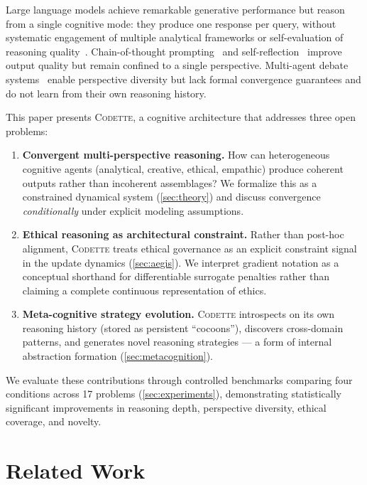 \documentclass[11pt,a4paper]{article}
\newcommand{\codette}{\textsc{Codette}}
\begin{document}
Large language models achieve remarkable generative performance but reason from a single cognitive mode: they produce one response per query, without systematic engagement of multiple analytical frameworks or self-evaluation of reasoning quality~\citep{bender2021dangers,bommasani2021opportunities}. Chain-of-thought prompting~\citep{wei2022chain} and self-reflection~\citep{shinn2023reflexion} improve output quality but remain confined to a single perspective. Multi-agent debate systems~\citep{wu2023autogen} enable perspective diversity but lack formal convergence guarantees and do not learn from their own reasoning history.

This paper presents \codette{}, a cognitive architecture that addresses three open problems:

\begin{enumerate}[leftmargin=*]
  \item \textbf{Convergent multi-perspective reasoning.} How can heterogeneous cognitive agents (analytical, creative, ethical, empathic) produce coherent outputs rather than incoherent assemblages? We formalize this as a constrained dynamical system (\cref{sec:theory}) and discuss convergence \emph{conditionally} under explicit modeling assumptions.
  \item \textbf{Ethical reasoning as architectural constraint.} Rather than post-hoc alignment, \codette{} treats ethical governance as an explicit constraint signal in the update dynamics (\cref{sec:aegis}). We interpret gradient notation as a conceptual shorthand for differentiable surrogate penalties rather than claiming a complete continuous representation of ethics.
  \item \textbf{Meta-cognitive strategy evolution.} \codette{} introspects on its own reasoning history (stored as persistent ``cocoons''), discovers cross-domain patterns, and generates novel reasoning strategies --- a form of internal abstraction formation (\cref{sec:metacognition}).
\end{enumerate}

We evaluate these contributions through controlled benchmarks comparing four conditions across 17 problems (\cref{sec:experiments}), demonstrating statistically significant improvements in reasoning depth, perspective diversity, ethical coverage, and novelty.

\section{Related Work}
\label{sec:related}
\end{document}

